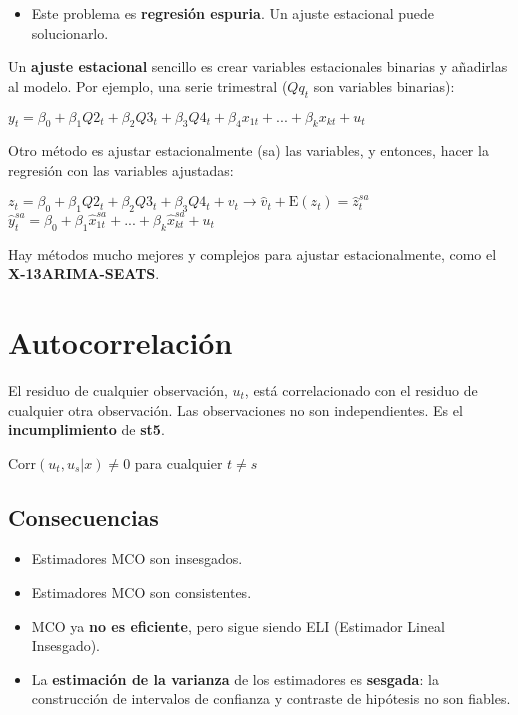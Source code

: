 \documentclass[10pt, a4paper, landscape]{extarticle}
\newcommand{\E}{\mathrm{E}}
\newcommand{\Corr}{\mathrm{Corr}}
\begin{document}
\begin{multicols}{3}
\begin{multicols}{2}
		\end{multicols}
		\begin{itemize}[leftmargin=*]
			\item Este problema es \textbf{regresión espuria}. Un ajuste estacional puede solucionarlo.
		\end{itemize}
		Un \textbf{ajuste estacional} sencillo es crear variables estacionales binarias y añadirlas al modelo. Por ejemplo, una serie trimestral ($Qq_t$ son variables binarias):
		\begin{center}
			$y_t = \beta_0 + \beta_1 Q2_t + \beta_2 Q3_t + \beta_3 Q4_t + \beta_4 x_{1t} + ... + \beta_k x_{kt} + u_t$
		\end{center}
		Otro método es ajustar estacionalmente (sa) las variables, y entonces, hacer la regresión con las variables ajustadas:
		\begin{center}
			$z_t = \beta_0 + \beta_1 Q2_t + \beta_2 Q3_t + \beta_3 Q4_t  + v_t \rightarrow \hat{v}_t + \E(z_t) = \hat{z}_t^{sa}$
			$\hat{y}_t^{sa} = \beta_0 + \beta_1 \hat{x}_{1t}^{sa} + ... + \beta_k \hat{x}_{kt}^{sa} + u_t$
		\end{center}
		Hay métodos mucho mejores y complejos para ajustar estacionalmente, como el \textbf{X-13ARIMA-SEATS}.
\columnbreak
\section*{Autocorrelación}
	El residuo de cualquier observación, $u_t$, está correlacionado con el residuo de cualquier otra observación. Las observaciones no son independientes. Es el \textbf{incumplimiento} de \textbf{st5}.
	\begin{center}
		$\Corr(u_t, u_s | x) \neq 0$ para cualquier $t \neq s$
	\end{center}
	\subsection*{Consecuencias}
		\begin{itemize}[leftmargin=*]
			\item Estimadores MCO son insesgados.
			\item Estimadores MCO son consistentes.
			\item MCO ya \textbf{no es eficiente}, pero sigue siendo ELI (Estimador Lineal Insesgado).
			\item La \textbf{estimación de la varianza} de los estimadores es \textbf{sesgada}: la construcción de intervalos de confianza y contraste de hipótesis no son fiables.
		\end{itemize}

\end{multicols}
\end{document}

